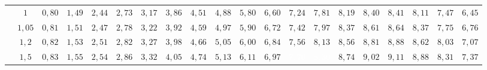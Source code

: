 \begin{table}[]
{\begin{tabular}{|c|c|c|c|c|c|c|c|c|c|c|c|c|c|c|c|c|c|c|c|}
                        & $1$                                                                                 & \cellcolor[HTML]{FFCCC9}$0,80$ & \cellcolor[HTML]{FFCCC9}$1,49$ & \cellcolor[HTML]{FD6864}$2,44$ & \cellcolor[HTML]{FD6864}$2,73$ & \cellcolor[HTML]{FD6864}$3,17$ & \cellcolor[HTML]{FE0000}$3,86$ & \cellcolor[HTML]{FE0000}$4,51$ & \cellcolor[HTML]{FE0000}$4,88$ & \cellcolor[HTML]{CB0000}$5,80$ & \cellcolor[HTML]{9A0000}$6,60$ & \cellcolor[HTML]{9A0000}$7,24$ & \cellcolor[HTML]{F8A102}$7,81$ & \cellcolor[HTML]{F56B00}$8,19$                        & \cellcolor[HTML]{F56B00}$8,40$ & \cellcolor[HTML]{CE6301}$8,41$ & \cellcolor[HTML]{963400}$8,11$ & \cellcolor[HTML]{963400}$7,47$ & \cellcolor[HTML]{963400}$6,45$ \\ \cline{2-20} 
                        & $1,05$                                                                              & \cellcolor[HTML]{FFCCC9}$0,81$ & \cellcolor[HTML]{FFCCC9}$1,51$ & \cellcolor[HTML]{FD6864}$2,47$ & \cellcolor[HTML]{FD6864}$2,78$ & \cellcolor[HTML]{FD6864}$3,22$ & \cellcolor[HTML]{FE0000}$3,92$ & \cellcolor[HTML]{FE0000}$4,59$ & \cellcolor[HTML]{FE0000}$4,97$ & \cellcolor[HTML]{CB0000}$5,90$ & \cellcolor[HTML]{9A0000}$6,72$ & \cellcolor[HTML]{9A0000}$7,42$ & \cellcolor[HTML]{F8A102}$7,97$ & \cellcolor[HTML]{F56B00}$8,37$                        & \cellcolor[HTML]{F56B00}$8,61$ & \cellcolor[HTML]{CE6301}$8,64$ & \cellcolor[HTML]{963400}$8,37$ & \cellcolor[HTML]{963400}$7,75$ & \cellcolor[HTML]{963400}$6,76$ \\ \cline{2-20} 
                        & $1,2$                                                                               & \cellcolor[HTML]{FFCCC9}$0,82$ & \cellcolor[HTML]{FFCCC9}$1,53$ & \cellcolor[HTML]{FD6864}$2,51$ & \cellcolor[HTML]{FD6864}$2,82$ & \cellcolor[HTML]{FD6864}$3,27$ & \cellcolor[HTML]{FE0000}$3,98$ & \cellcolor[HTML]{FE0000}$4,66$ & \cellcolor[HTML]{FE0000}$5,05$ & \cellcolor[HTML]{CB0000}$6,00$ & \cellcolor[HTML]{9A0000}$6,84$ & \cellcolor[HTML]{9A0000}$7,56$ & \cellcolor[HTML]{F8A102}$8,13$ & \cellcolor[HTML]{F56B00}$8,56$                        & \cellcolor[HTML]{F56B00}$8,81$ & \cellcolor[HTML]{CE6301}$8,88$ & \cellcolor[HTML]{963400}$8,62$ & \cellcolor[HTML]{963400}$8,03$ & \cellcolor[HTML]{963400}$7,07$ \\ \cline{2-20} 
                        & $1,5$                                                                               & \cellcolor[HTML]{FFCCC9}$0,83$ & \cellcolor[HTML]{FFCCC9}$1,55$ & \cellcolor[HTML]{FD6864}$2,54$ & \cellcolor[HTML]{FD6864}$2,86$ & \cellcolor[HTML]{FD6864}$3,32$ & \cellcolor[HTML]{FE0000}$4,05$ & \cellcolor[HTML]{FE0000}$4,74$ & \cellcolor[HTML]{FE0000}$5,13$ & \cellcolor[HTML]{CB0000}$6,11$ & \cellcolor[HTML]{9A0000}$6,97$ & \cellcolor[HTML]{9A0000}\textcolor{white}{$7,70$} & \cellcolor[HTML]{F8A102}\textcolor{white}{$8,30$} & \cellcolor[HTML]{F56B00}$8,74$                        & \cellcolor[HTML]{F56B00}$9,02$ & \cellcolor[HTML]{CE6301}$9,11$ & \cellcolor[HTML]{963400}$8,88$ & \cellcolor[HTML]{963400}$8,31$ & \cellcolor[HTML]{963400}$7,37$ \\ \cline{2-20} 

\end{tabular}}
\end{table}

